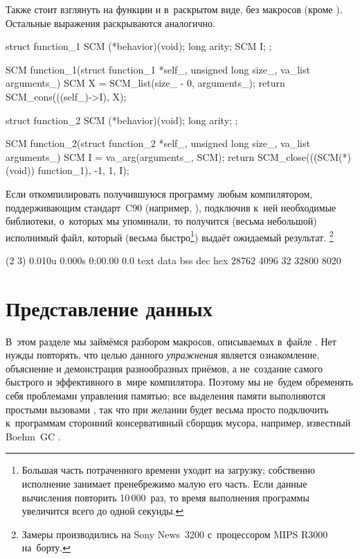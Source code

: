 Также стоит взглянуть на функции  и  в~раскрытом
виде, без макросов (кроме ). Остальные выражения раскрываются
аналогично.

\begin{code:c}
struct function_1 {
    SCM     (*behavior)(void);
    long    arity;
    SCM     I;
};

SCM function_1(struct function_1 *self_,
               unsigned long size_,
               va_list arguments_)
{
    SCM X = SCM_list(size_ - 0, arguments_);
    return SCM_cons(((self_)->I), X);
}

struct function_2 {
    SCM     (*behavior)(void);
    long    arity;
};

SCM function_2(struct function_2 *self_,
               unsigned long size_,
               va_list arguments_)
{
    SCM I = va_arg(arguments_, SCM);
    return SCM_close(((SCM(*)(void)) function_1), -1, 1, I);
}
\end{code:c}

Если откомпилировать получившуюся программу любым компилятором, поддерживающим
стандарт~C90 (например, ), подключив к~ней необходимые библиотеки,
о~которых мы упоминали, то получится (весьма небольшой) исполнимый файл,
который (весьма быстро\footnote{Большая часть потраченного времени уходит на
загрузку; собственно исполнение занимает пренебрежимо малую его часть. Если
данные вычисления повторить 10\,000~раз, то время выполнения программы
увеличится всего до одной секунды.}) выдаёт ожидаемый результат.%
\footnote*{Замеры производились на Sony News~3200 с~процессором MIPS R3000
на~борту.}

\begin{shell}
(2 3)
0.010u 0.000s 0:00.00 0.0%
text    data    bss     dec     hex
28762   4096    32      32800   8020
\end{shell}



\section{Представление данных}\label{cc/sect:data}

В~этом разделе мы займёмся разбором макросов, описываемых в~файле
. Нет нужды повторять, что целью данного \emph{упражнения}
является ознакомление, объяснение и демонстрация разнообразных приёмов, а
не~создание самого быстрого и эффективного в~мире компилятора. Поэтому мы
не~будем обременять себя проблемами управления памятью; все выделения памяти
выполняются простыми вызовами , так что при желании будет весьма
просто подключить к~программам сторонний консервативный сборщик мусора,
например, известный Boehm~GC \cite{bw88}.

